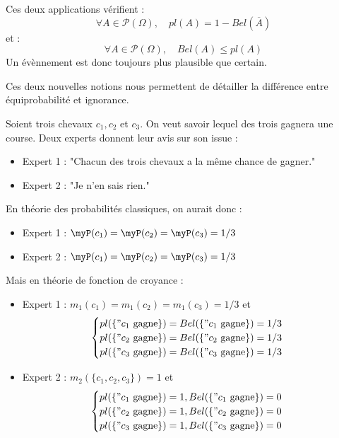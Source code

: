 \begin{prop}
    Ces deux applications vérifient : 
    \begin{equation}
        \forall A \in \mathcal{P}( \Omega), \quad pl(A) = 1 - Bel( \overline{A}) 
    \end{equation}
    et : 
    \begin{equation}
        \forall A \in \mathcal{P}( \Omega), \quad Bel(A) \leqslant pl(A)
    \end{equation}
    Un évènnement est donc toujours plus plausible que certain. 
\end{prop}

Ces deux nouvelles notions nous permettent de détailler la différence entre équiprobabilité et 
ignorance. 

\begin{example}
    Soient trois chevaux $c_1, c_2$ et $c_3$. On veut savoir lequel des trois gagnera une course. 
    Deux experts donnent leur avis sur son issue : 
    \begin{itemize} 
        \item Expert 1 : "Chacun des trois chevaux a la même chance de gagner."
        \item Expert 2 : "Je n'en sais rien." 
    \end{itemize}
    En théorie des probabilités classiques, on aurait donc : 
    \begin{itemize} 
        \item Expert 1 : $ \myP(c_1) = \myP(c_2) = \myP(c_3) = 1/3$ 
        \item Expert 2 : $ \myP(c_1) = \myP(c_2) = \myP(c_3) = 1/3$ 
    \end{itemize}
    Mais en théorie de fonction de croyance : 
    \begin{itemize} 
        \item Expert 1 : $ m_1(c_1) = m_1(c_2) = m_1(c_3) = 1/3$ et 
            $$ 
                \begin{cases}
                    pl(\{"c_1 \text{ gagne}\}) = Bel(\{"c_1 \text{ gagne}\}) = 1/3 \\ 
                    pl(\{"c_2 \text{ gagne}\}) = Bel(\{"c_2 \text{ gagne}\}) = 1/3 \\ 
                    pl(\{"c_3 \text{ gagne}\}) = Bel(\{"c_3 \text{ gagne}\}) = 1/3 \\ 
                \end{cases}
            $$ 
        \item Expert 2 : $ m_2(\{c_1, c_2, c_3\}) = 1$ et 
            $$ 
                \begin{cases}
                    pl(\{"c_1 \text{ gagne}\}) = 1, Bel(\{"c_1 \text{ gagne}\}) = 0 \\ 
                    pl(\{"c_2 \text{ gagne}\}) = 1, Bel(\{"c_2 \text{ gagne}\}) = 0 \\ 
                    pl(\{"c_3 \text{ gagne}\}) = 1, Bel(\{"c_3 \text{ gagne}\}) = 0 \\ 
                \end{cases}
            $$
    \end{itemize}
\end{example}

